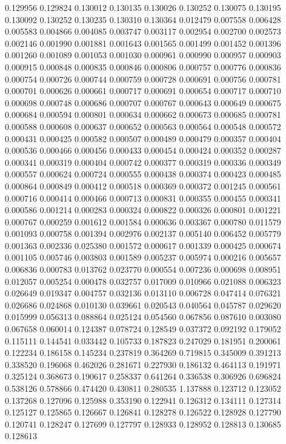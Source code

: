 0.129956
0.129824
0.130012
0.130135
0.130026
0.130252
0.130075
0.130195
0.130092
0.130252
0.130235
0.130310
0.130364
0.012479
0.007558
0.006428
0.005583
0.004866
0.004085
0.003747
0.003117
0.002954
0.002700
0.002573
0.002146
0.001990
0.001881
0.001643
0.001565
0.001499
0.001452
0.001396
0.001260
0.001089
0.001053
0.001030
0.000961
0.000990
0.000957
0.000903
0.000915
0.000848
0.000835
0.000846
0.000806
0.000757
0.000776
0.000836
0.000754
0.000726
0.000744
0.000759
0.000728
0.000691
0.000756
0.000781
0.000701
0.000626
0.000661
0.000717
0.000691
0.000654
0.000717
0.000710
0.000698
0.000748
0.000686
0.000707
0.000767
0.000643
0.000649
0.000675
0.000684
0.000594
0.000801
0.000634
0.000662
0.000673
0.000685
0.000781
0.000588
0.000608
0.000637
0.000652
0.000563
0.000564
0.000548
0.000572
0.000431
0.000425
0.000582
0.000507
0.000489
0.000479
0.000357
0.000404
0.000536
0.000466
0.000456
0.000433
0.000454
0.000424
0.000352
0.000287
0.000341
0.000319
0.000404
0.000742
0.000377
0.000319
0.000336
0.000349
0.000557
0.000624
0.000724
0.000555
0.000438
0.000374
0.000423
0.000485
0.000864
0.000849
0.000412
0.000518
0.000369
0.000372
0.001245
0.000561
0.000716
0.000414
0.000466
0.000713
0.000831
0.000355
0.000455
0.000341
0.000586
0.001214
0.000283
0.000324
0.000822
0.000326
0.000801
0.001221
0.000767
0.000259
0.001612
0.001584
0.000636
0.003367
0.000780
0.011579
0.001093
0.000758
0.001394
0.002976
0.002137
0.005140
0.006452
0.005779
0.001363
0.002336
0.025380
0.001572
0.000617
0.001339
0.000425
0.000674
0.001105
0.005746
0.003803
0.001589
0.005237
0.005974
0.000216
0.005657
0.006836
0.000783
0.013762
0.023770
0.000554
0.007236
0.000698
0.008951
0.012057
0.005254
0.000478
0.032757
0.017009
0.010966
0.021088
0.006323
0.026649
0.019347
0.004757
0.032136
0.013110
0.006728
0.047414
0.076321
0.026686
0.024868
0.010130
0.039661
0.020543
0.040564
0.045787
0.029620
0.015999
0.056313
0.088864
0.025124
0.054560
0.067856
0.087610
0.003080
0.067658
0.060014
0.124387
0.078724
0.128549
0.037372
0.092192
0.179052
0.115111
0.144541
0.033442
0.105733
0.187823
0.247029
0.181951
0.200061
0.122234
0.186158
0.145234
0.237819
0.364269
0.719815
0.345009
0.391213
0.338520
0.196068
0.462026
0.281671
0.227930
0.186132
0.464113
0.191971
0.325124
0.368673
0.190617
0.258337
0.641264
0.336538
0.306926
0.696824
0.538126
0.578866
0.474420
0.430811
0.280535
1.137888
0.123712
0.123052
0.137268
0.127096
0.125988
0.353190
0.122941
0.126312
0.134111
0.127314
0.125127
0.125865
0.126667
0.126841
0.128278
0.126522
0.128928
0.127790
0.120741
0.128247
0.127699
0.127797
0.128933
0.128952
0.128813
0.130685
0.128613
